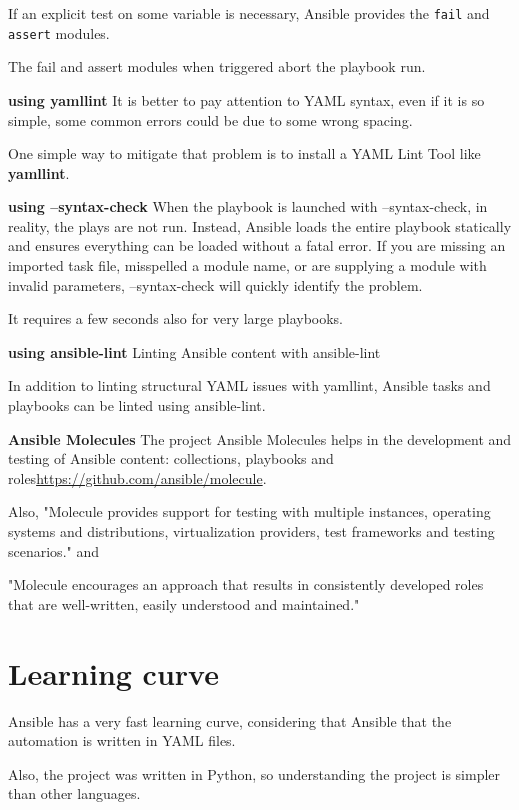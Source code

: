 \documentclass[12pt,a4paper,openright,twoside]{book}
\begin{document}
If an explicit test on some variable is necessary, Ansible provides the \texttt{fail} and \texttt{assert} modules.


The fail and assert modules when triggered abort the playbook run.

\textbf{using yamllint}
It is better to pay attention to YAML syntax, even if it is so simple, some common errors could be due to some wrong spacing.


One simple way to mitigate that problem is to install a YAML Lint Tool like \textbf{yamllint}.

\textbf{using --syntax-check}
When the playbook is launched with --syntax-check, in reality, the plays are not run. Instead, Ansible loads the entire playbook statically and ensures everything can be loaded without a fatal error. If you are missing an imported task file, misspelled a module name, or are supplying a module with invalid parameters, --syntax-check will quickly identify the problem.


It requires a few seconds also for very large playbooks.

\textbf{using ansible-lint}
Linting Ansible content with ansible-lint


In addition to linting structural YAML issues with yamllint, Ansible tasks and playbooks can be linted using ansible-lint.

\textbf{Ansible Molecules}
The project Ansible Molecules helps in the development and testing of Ansible content: collections, playbooks and roles\url{https://github.com/ansible/molecule}.


Also, "Molecule provides support for testing with multiple instances, operating systems and distributions, virtualization providers, test frameworks and testing scenarios." and 


"Molecule encourages an approach that results in consistently developed roles that are well-written, easily understood and maintained."\cite{ansibleMolecule}

\section{Learning curve}
Ansible has a very fast learning curve, considering that Ansible that the automation is written in YAML files.


Also, the project was written in Python, so understanding the project is simpler than other languages.

\end{document}
